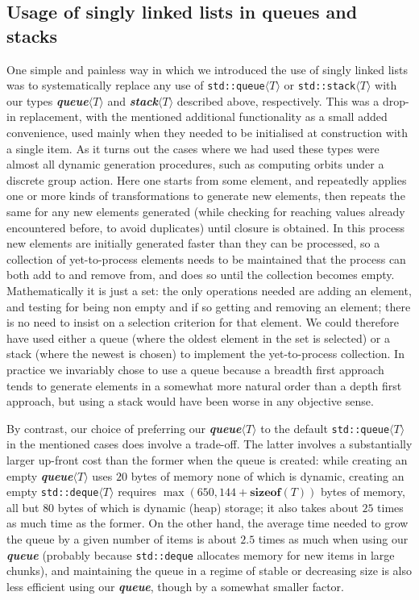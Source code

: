 \documentclass[12pt]{article}
\theoremstyle{plain}
\theoremstyle{definition}
\newcommand\std[1]{\texttt{std::#1}}
\def\queue.{\textbf{\textit{queue}}}
\def\stack.{\textbf{\textit{stack}}}
\def\ang#1{\langle#1\rangle}
\begin{document}
\subsection{Usage of singly linked lists in queues and stacks}

One simple and painless way in which we introduced the use of singly linked
lists was to systematically replace any use of \std{queue}$\ang{T}$ or
\std{stack}$\ang{T}$ with our types \queue.$\ang{T}$ and \stack.$\ang{T}$
described above, respectively. This was a drop-in replacement, with the
mentioned additional functionality as a small added convenience, used mainly
when they needed to be initialised at construction with a single item. As it
turns out the cases where we had used these types were almost all dynamic
generation procedures, such as computing orbits under a discrete group action.
Here one starts from some element, and repeatedly applies one or more kinds of
transformations to generate new elements, then repeats the same for any new
elements generated (while checking for reaching values already encountered
before, to avoid duplicates) until closure is obtained. In this process new
elements are initially generated faster than they can be processed, so a
collection of yet-to-process elements needs to be maintained that the process
can both add to and remove from, and does so until the collection becomes empty.
Mathematically it is just a set: the only operations needed are adding an
element, and testing for being non empty and if so getting and removing an
element; there is no need to insist on a selection criterion for that element.
We could therefore have used either a queue (where the oldest element in the set
is selected) or a stack (where the newest is chosen) to implement the
yet-to-process collection. In practice we invariably chose to use a queue
because a breadth first approach tends to generate elements in a somewhat more
natural order than a depth first approach, but using a stack would have been
worse in any objective sense.

By contrast, our choice of preferring our \queue.$\ang{T}$ to the default
\std{queue}$\ang{T}$ in the mentioned cases does involve a trade-off. The latter
involves a substantially larger up-front cost than the former when the queue is
created: while creating an empty \queue.$\ang{T}$ uses $20$ bytes of memory none
of which is dynamic, creating an empty \std{deque}$\ang{T}$ requires
$\max(650,144+\textbf{sizeof}(T))$ bytes of memory, all but $80$ bytes of which
is dynamic (heap) storage; it also takes about $25$ times as much time as the
former. On the other hand, the average time needed to grow the queue by a given
number of items is about $2.5$ times as much when using our \queue. (probably
because \std{deque} allocates memory for new items in large chunks), and
maintaining the queue in a regime of stable or decreasing size is also less
efficient using our \queue., though by a somewhat smaller factor.
\end{document}
